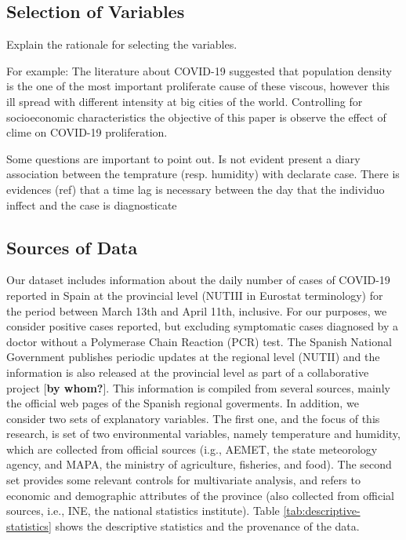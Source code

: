 \documentclass[]{elsarticle} %
\begin{document}
\hypertarget{selection-of-variables}{%
\subsection{Selection of Variables}\label{selection-of-variables}}

Explain the rationale for selecting the variables.

For example: The literature about COVID-19 suggested that population
density is the one of the most important proliferate cause of these
viscous, however this ill spread with different intensity at big cities
of the world. Controlling for socioeconomic characteristics the
objective of this paper is observe the effect of clime on COVID-19
proliferation.

Some questions are important to point out. Is not evident present a
diary association between the temprature (resp. humidity) with declarate
case. There is evidences (ref) that a time lag is necessary between the
day that the individuo inffect and the case is diagnosticate

\hypertarget{sources-of-data}{%
\subsection{Sources of Data}\label{sources-of-data}}

Our dataset includes information about the daily number of cases of
COVID-19 reported in Spain at the provincial level (NUTIII in Eurostat
terminology) for the period between March 13th and April 11th,
inclusive. For our purposes, we consider positive cases reported, but
excluding symptomatic cases diagnosed by a doctor without a Polymerase
Chain Reaction (PCR) test. The Spanish National Government publishes
periodic updates at the regional level (NUTII) and the information is
also released at the provincial level as part of a collaborative project
{[}\textbf{by whom?}{]}. This information is compiled from several
sources, mainly the official web pages of the Spanish regional
goverments. In addition, we consider two sets of explanatory variables.
The first one, and the focus of this research, is set of two
environmental variables, namely temperature and humidity, which are
collected from official sources (i.g., AEMET, the state meteorology
agency, and MAPA, the ministry of agriculture, fisheries, and food). The
second set provides some relevant controls for multivariate analysis,
and refers to economic and demographic attributes of the province (also
collected from official sources, i.e., INE, the national statistics
institute). Table \ref{tab:descriptive-statistics} shows the descriptive
statistics and the provenance of the data.
\end{document}
